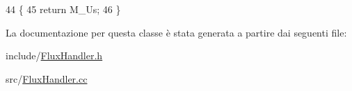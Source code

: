 \begin{DoxyCode}
44     \{
45         \textcolor{keywordflow}{return} M\_Us;
46     \}
\end{DoxyCode}


La documentazione per questa classe è stata generata a partire dai seguenti file\-:\begin{DoxyCompactItemize}
\item 
include/\hyperlink{FluxHandler_8h}{Flux\-Handler.\-h}\item 
src/\hyperlink{FluxHandler_8cc}{Flux\-Handler.\-cc}\end{DoxyCompactItemize}
